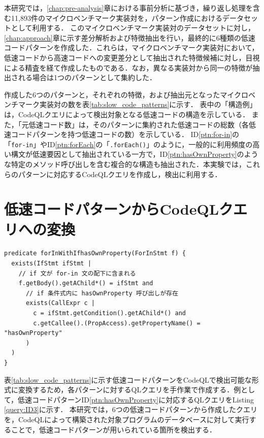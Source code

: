 \documentclass[11pt]{jreport}
\begin{document}
本研究では，\ref{chap:pre-analysis}章における事前分析に基づき，繰り返し処理を含む11,893件のマイクロベンチマーク実装対を，パターン作成におけるデータセットとして利用する．
このマイクロベンチマーク実装対のデータセットに対し，\ref{chap:approach}章に示す差分解析および特徴抽出を行い，最終的に6種類の低速コードパターンを作成した．これらは，マイクロベンチマーク実装対において，低速コードから高速コードへの変更差分として抽出された特徴候補に対し，目視による精査を経て作成したものである．なお，異なる実装対から同一の特徴が抽出される場合は1つのパターンとして集約した．

作成した6つのパターンと，それぞれの特徴，および抽出元となったマイクロベンチマーク実装対の数を表\ref{tab:slow_code_patterns}に示す．
表中の「構造例」は，CodeQLクエリによって検出対象となる低速コードの構造を示している．
また，「元低速コード数」は，そのパターンに集約された低速コードの総数（各低速コードパターンを持つ低速コードの数）を示している．
ID\ref{ptn:for-in}の「\texttt{for-in}」やID\ref{ptn:forEach}の「\texttt{.forEach()}」のように，一般的に利用頻度の高い構文が低速要因として抽出されている一方で，ID\ref{ptn:hasOwnProperty}のような特定のメソッド呼び出しを含む複合的な構造も抽出された．本実験では，これらのパターンに対応するCodeQLクエリを作成し，検出に利用する．


\section{低速コードパターンからCodeQLクエリへの変換}

\begin{lstlisting}[caption=ID\ref{ptn:hasOwnProperty}に対応するQLクエリ, label=query:ID3, captionpos=t, columns=flexible, escapechar=\@]
predicate forInWithIfhasOwnProperty(ForInStmt f) {
  exists(IfStmt ifStmt |
    // if 文が for-in 文の配下に含まれる
    f.getBody().getAChild*() = ifStmt and    
      // if 条件式内に hasOwnProperty 呼び出しが存在
      exists(CallExpr c |
        c = ifStmt.getCondition().getAChild*() and
        c.getCallee().(PropAccess).getPropertyName() = "hasOwnProperty"
      )
  )
}
\end{lstlisting}

表\ref{tab:slow_code_patterns}に示す低速コードパターンをCodeQLで検出可能な形式に変換するため，各パターンに対するQLクエリを手作業で作成する．例として，低速コードパターンID\ref{ptn:hasOwnProperty}に対応するQLクエリをListing \ref{query:ID3}に示す．
本研究では，6つの低速コードパターンから作成したクエリを，CodeQLによって構築された対象プログラムのデータベースに対して実行することで，低速コードパターンが用いられている箇所を検出する．
\end{document}
